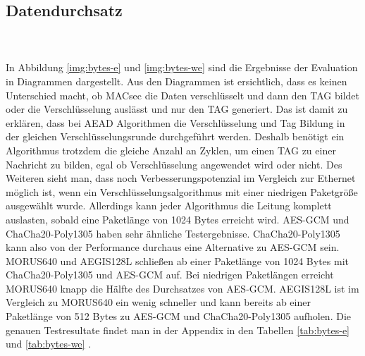 \subsection{Datendurchsatz}
\\
\\
In Abbildung \ref{img:bytes-e} und \ref{img:bytes-we} sind die Ergebnisse der Evaluation in Diagrammen dargestellt.
Aus den Diagrammen ist ersichtlich, dass es keinen Unterschied macht, ob \gls{MACsec} die Daten verschlüsselt und dann den TAG bildet oder die Verschlüsselung auslässt und nur den TAG generiert. Das ist damit zu erklären, dass bei \gls{AEAD} Algorithmen die Verschlüsselung und Tag Bildung in der gleichen Verschlüsselungsrunde durchgeführt werden. Deshalb benötigt ein Algorithmus trotzdem die gleiche Anzahl an Zyklen, um einen TAG zu einer Nachricht zu bilden,
egal ob Verschlüsselung angewendet wird oder nicht. Des Weiteren sieht man, dass noch Verbesserungspotenzial im Vergleich zur Ethernet möglich ist, wenn ein Verschlüsselungsalgorithmus mit einer niedrigen Paketgröße ausgewählt wurde. Allerdings kann jeder Algorithmus die Leitung komplett auslasten, sobald eine Paketlänge von 1024 Bytes erreicht wird. \gls{AES-GCM} und ChaCha20-Poly1305 haben sehr ähnliche Testergebnisse. ChaCha20-Poly1305 kann also von der Performance durchaus eine Alternative zu \gls{AES-GCM} sein. MORUS640 und AEGIS128L schließen ab einer Paketlänge von 1024 Bytes mit ChaCha20-Poly1305 und AES-GCM auf. Bei niedrigen Paketlängen erreicht MORUS640 knapp die Hälfte des Durchsatzes von AES-GCM. AEGIS128L ist im Vergleich zu MORUS640 ein wenig schneller und kann bereits ab einer Paketlänge von 512 Bytes zu \gls{AES-GCM} und ChaCha20-Poly1305 aufholen. Die genauen Testresultate findet man in der Appendix in den Tabellen \ref{tab:bytes-e} und \ref{tab:bytes-we} .
